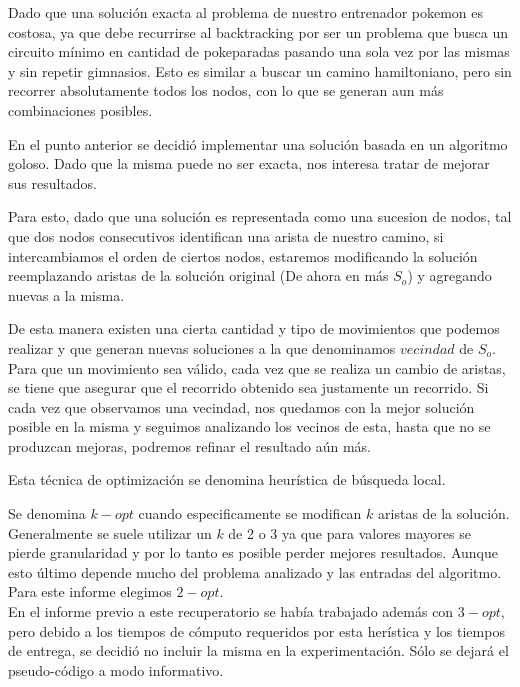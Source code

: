 Dado que una solución exacta al problema de nuestro entrenador pokemon es costosa, ya que debe recurrirse al backtracking por ser un problema que busca un circuito mínimo en cantidad de pokeparadas pasando una sola vez por las mismas y sin repetir gimnasios. Esto es similar a buscar un camino hamiltoniano, pero sin recorrer absolutamente todos los nodos, con lo que se generan aun más combinaciones posibles.

En el punto anterior se decidió implementar una solución basada en un algoritmo goloso. Dado que la misma puede no ser exacta, nos interesa tratar de mejorar sus resultados. 

Para esto, dado que una solución es representada como una sucesion de nodos, tal que dos nodos consecutivos identifican una arista de nuestro camino, si intercambiamos el orden de ciertos nodos, estaremos modificando la solución reemplazando aristas de la solución original (De ahora en más $S_o$) y agregando nuevas a la misma. 

De esta manera existen una cierta cantidad y tipo de movimientos que podemos realizar y que generan nuevas soluciones a la que denominamos $vecindad$ de $S_o$.
Para que un movimiento sea válido, cada vez que se realiza un cambio de aristas, se tiene que asegurar que el recorrido obtenido sea justamente un recorrido.
Si cada vez que observamos una vecindad, nos quedamos con la mejor solución posible en la misma y seguimos analizando los vecinos de esta, hasta que no se produzcan mejoras, podremos refinar el resultado aún más.

Esta técnica de optimización se denomina heurística de búsqueda local.

Se denomina $k-opt$ cuando especificamente se modifican $k$ aristas de la solución. Generalmente se suele utilizar un $k$ de 2 o 3 ya que para valores mayores se pierde granularidad y por lo tanto es posible perder mejores resultados. Aunque esto último depende mucho del problema analizado y las entradas del algoritmo. Para este informe elegimos $2-opt$.\\ 

En el informe previo a este recuperatorio se había trabajado además con $3-opt$, pero debido a los tiempos de cómputo requeridos por esta herística y los tiempos de entrega, se decidió no incluir la misma en la experimentación. Sólo se dejará el pseudo-código a modo informativo.


